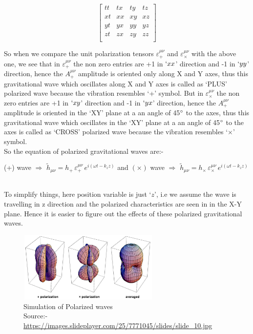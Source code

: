 \begin{equation*}
    \begin{bmatrix}
    tt & tx & ty & tz \\
    xt & xx & xy & xz \\
    yt & yx & yy & yz \\
    zt & zx & zy & zz \\
    \end{bmatrix}
\end{equation*}

\noindent So when we compare the unit polarization tensors $\varepsilon^{\mu\nu}_{+}$ and $\varepsilon^{\mu\nu}_{\times}$ with the above one, we see that in $\varepsilon^{\mu\nu}_{+}$ the non zero entries are +1 in $`xx$' direction and -1 in $`yy$' direction, hence the $A^{\mu\nu}_{+}$ amplitude is oriented only along X and Y axes, thus this gravitational wave which oscillates along X and Y axes is called as `PLUS' polarized wave because the vibration resembles `+' symbol. But in $\varepsilon^{\mu\nu}_{\times}$ the non zero entries are +1 in $`xy$' direction and -1 in $`yx$' direction, hence the $A^{\mu\nu}_{+}$ amplitude is oriented in the `XY' plane at a an angle of 45$\degree$ to the axes, thus this gravitational wave which oscillates in the `XY' plane at a an angle of 45$\degree$ to the axes is called as `CROSS' polarized wave because the vibration resembles `$\times$' symbol. 
\\

\noindent So the equation of polarized gravitational waves are:-\\
\begin{centre}
(+) wave $\Rightarrow $  $\tilde{h}_{\mu\nu} = h_{+}\, \varepsilon^{\mu\nu}_{+}\, e^{i(\omega t - k_{z}z)}$ \; and \; $(\times)$ wave $\Rightarrow $  $\tilde{h}_{\mu\nu} = h_{\times}\, \varepsilon^{\mu\nu}_{\times}\, e^{i(\omega t - k_{z}z)}$
\end{centre}
\\
\noindent To simplify things, here position variable is just `$z$', i.e we assume the wave is travelling in z direction and the polarized characteristics are seen in in the X-Y plane. Hence it is easier to figure out the effects of these polarized gravitational waves.

\begin{figure}[h]
    \centering
    \includegraphics[height=3.5cm, width = 7cm]{images.tex/polarization_simulation.jpeg}
    \caption{Simulation of Polarized waves\\ Source:- \url{https://images.slideplayer.com/25/7771045/slides/slide_10.jpg}}
\end{figure}

\pagebreak
